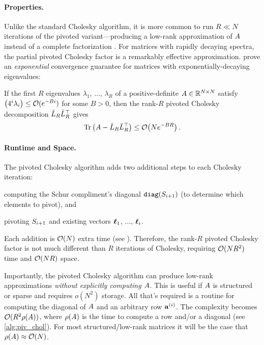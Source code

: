 \paragraph{Properties.}
Unlike the standard Cholesky algorithm, it is more common to run $R \ll N$ iterations of the pivoted variant---producing a low-rank approximation of $A$ instead of a complete factorization \cite{harbrecht2012low}.
For matrices with rapidly decaying spectra, the partial pivoted Cholesky factor is a remarkably effective approximation.
\citet{harbrecht2012low} prove an \emph{exponential} convergence guarantee for matrices with exponentially-decaying eigenvalues:
%
\begin{theorem}
\label{thm:harbrecht}
  If the first $R$ eigenvalues $\lambda_1$, $\ldots$, $\lambda_R$ of a positive-definite $A \in \mathbb{R}^{N \times N}$ satisfy $\left( 4^{i}\lambda_{i} \right) \leq \bigo{e^{-Bi}}$ for some $B>0$,
  then the rank-$R$ pivoted Cholesky decomposition $\bar{L}_{R} \bar{L}_R^\top$ gives
  \[
    \tr{\bA -  \bar\bL_R \bar\bL_R^\top} \leq \bigo{N e^{-BR}}.
  \]
\end{theorem}


\paragraph{Runtime and Space.}
The pivoted Cholesky algorithm adds two additional steps to each Cholesky iteration:
%
\begin{enumerate*}
  \item computing the Schur compliment's diagonal $\texttt{diag}(S_{i+1})$ (to determine which elements to pivot), and
  \item pivoting $S_{i+1}$ and existing vectors $\boldsymbol{\ell}_1$, $\ldots$, $\boldsymbol{\ell}_i$.
\end{enumerate*}
%
Each addition is $\bigo{N}$ extra time (see \citep[][Thm. 1]{harbrecht2012low}).
Therefore, the rank-$R$ pivoted Cholesky factor is not much different than $R$ iterations of Cholesky, requiring $\bigo{N R^2}$ time and $\bigo{NR}$ space.

Importantly, the pivoted Cholesky algorithm can produce low-rank approximations \emph{without explicitly computing $A$}.
This is useful if $A$ is structured or sparse and requires $o(N^2)$ storage.
All that's required is a routine for computing the diagonal of $A$ and an arbitrary row $\mathbf{a}^{(i)}$.
The complexity becomes $\bigo{R^2 \row{\bA}}$, where $\rho ( A )$ is the time to compute a row and/or a diagonal (see \cref{alg:piv_chol}).
For most structured/low-rank matrices it will be the case that $\row{\bA} \approx \bigo{N}$.


